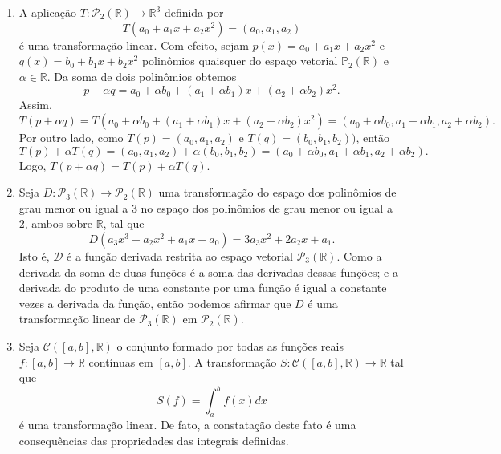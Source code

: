 \begin{enumerate}
\item A aplicação $T: \mathcal{P}_2(\mathbb{R}) \rightarrow \mathbb{R}^3$ definida por $$T(a_0+a_1x+a_2x^2)=(a_0, a_1, a_2)$$ é uma transformação linear. Com efeito, sejam $p(x)=a_0+a_1x+a_2x^2$ e $q(x)=b_0+b_1x+b_2x^2$ polinômios quaisquer do espaço vetorial $\mathbb{P}_2(\mathbb{R})$ e $\alpha \in \mathbb{R}$.  Da soma de dois polinômios obtemos $$p+\alpha q=a_0+\alpha b_0+(a_1+\alpha b_1)x+(a_2+\alpha b_2)x^2.$$ Assim, $$T(p+\alpha q)=T(a_0+\alpha b_0+(a_1+\alpha b_1)x+(a_2+\alpha b_2)x^2)=(a_0+\alpha b_0, a_1+\alpha b_1, a_2+\alpha b_2).$$
Por outro lado, como $T(p)=(a_0, a_1,a_2)$ e $T(q)=(b_0, b_1, b_2))$, então  $$T(p) +\alpha T(q)=(a_0, a_1, a_2) + \alpha ( b_0, b_1, b_2)=(a_0+\alpha b_0, a_1+\alpha b_1, a_2+\alpha b_2).$$ Logo, $ T(p+\alpha q)=T(p)+\alpha T(q)$.

\item Seja $D: \mathcal{P}_3(\mathbb{R}) \rightarrow \mathcal{P}_2(\mathbb{R})$ uma transformação do espaço dos polinômios de grau menor ou igual a 3 no espaço dos polinômios de grau menor ou igual a 2, ambos sobre $\mathbb{R}$, tal que $$D(a_3x^3+a_2x^2+a_1x+a_0)=3a_3x^2+2a_2x+a_1.$$ Isto é, $\mathcal{D}$ é a função derivada restrita ao espaço vetorial $\mathcal{P}_3(\mathbb{R})$. Como a derivada da soma de duas funções é a soma das derivadas dessas funções; e a derivada do produto de uma constante por uma função é igual a constante vezes a derivada da função, então podemos afirmar que $D$ é uma transformação linear de $\mathcal{P}_3(\mathbb{R})$ em $ \mathcal{P}_2(\mathbb{R})$.

\item Seja $\mathcal{C}([a,b], \mathbb{R})$ o conjunto formado por todas as funções reais  $f: [a,b] \rightarrow \mathbb{R}$ contínuas em $[a,b]$. A transformação  $S: \mathcal{C}([a,b], \mathbb{R}) \rightarrow \mathbb{R}$ tal que $$S(f)=\int_{a}^{b}f(x)dx$$ é uma transformação linear. De fato, a constatação deste fato é uma consequências das propriedades das integrais definidas.
\end{enumerate}

